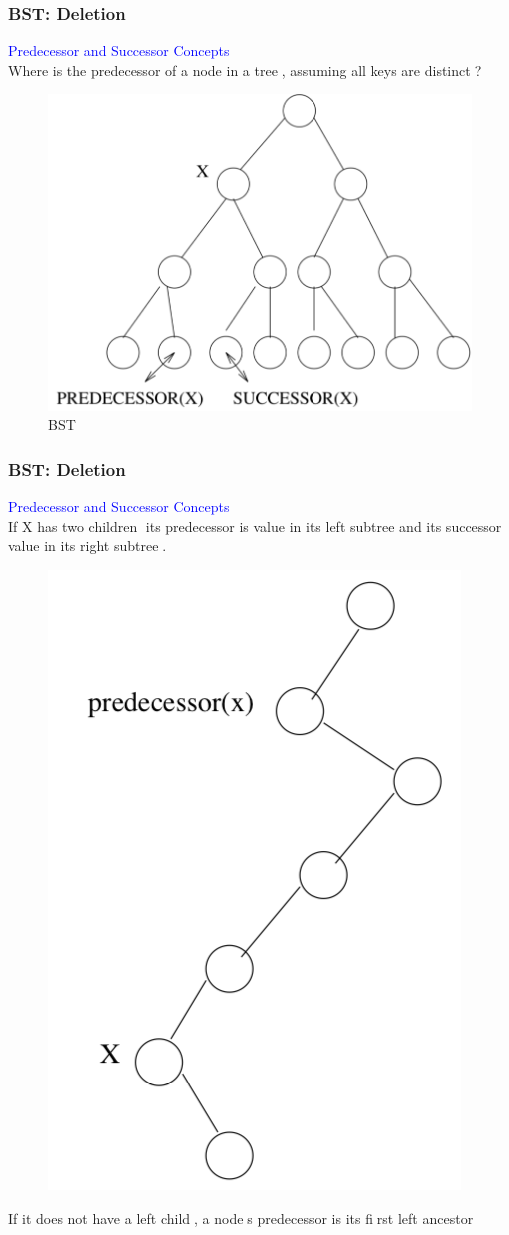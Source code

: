 \documentclass[11pt]{beamer}
\begin{document}
    \begin{frame}
	   	\frametitle{BST: Deletion} 
	   	 \textcolor{blue}{ Predecessor and Successor Concepts}\\
	   	 Where is the predecessor of a node in a tree􏰎, assuming all keys are distinct􏰀?
	    \begin{figure}
	    	\centering
	    	\includegraphics[width=0.7\linewidth]{"Screenshot 2020-11-15 at 9.48.41 PM"}
	    	\caption{BST}
	    	\label{}
	    \end{figure}
   \end{frame}	

     \begin{frame}
    	\frametitle{BST: Deletion} 
    	\textcolor{blue}{ Predecessor and Successor Concepts}\\
    	If X has two children􏰎 its predecessor is value in its left subtree and its successor value in its right subtree􏰈. 
    	\begin{figure}
    		\centering
    		\includegraphics[width=0.3\linewidth]{"Screenshot 2020-11-15 at 9.54.39 PM"}
    		\caption{}
    		\label{fig:screenshot-2020-11-15-at-9}
    	\end{figure}
    	
    	\alert {If it does not have a left child􏰎, a node􏰐s predecessor is its fi􏰂rst left ancestor}
    \end{frame}	
\end{document}
